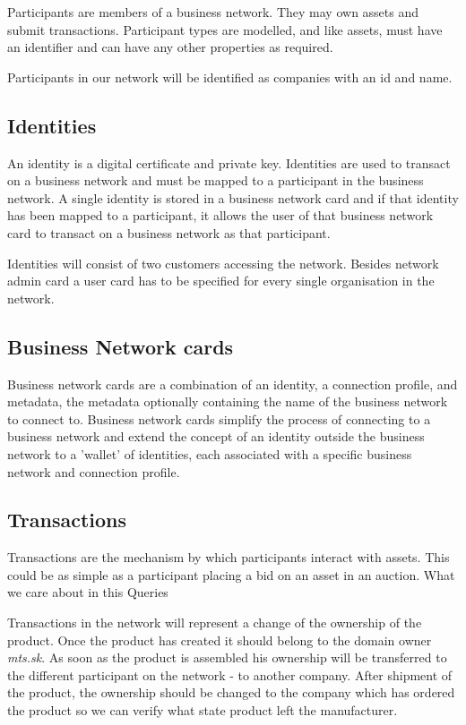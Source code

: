 Participants are members of a business network. They may own assets and submit transactions. Participant types are modelled, and like assets, must have an identifier and can have any other properties as required.

Participants in our network will be identified as companies with an id and name. 

\subsection{Identities}
An identity is a digital certificate and private key. Identities are used to transact on a business network and must be mapped to a participant in the business network. A single identity is stored in a business network card and if that identity has been mapped to a participant, it allows the user of that business network card to transact on a business network as that participant.

Identities will consist of two customers accessing the network. Besides network admin card a user card has to be specified for every single organisation in the network.

\subsection{Business Network cards}

Business network cards are a combination of an identity, a connection profile, and metadata, the metadata optionally containing the name of the business network to connect to. Business network cards simplify the process of connecting to a business network and extend the concept of an identity outside the business network to a 'wallet' of identities, each associated with a specific business network and connection profile.

\subsection{Transactions}

Transactions are the mechanism by which participants interact with assets. This could be as simple as a participant placing a bid on an asset in an auction. What we care about in this 
Queries

Transactions in the network will represent a change of the ownership of the product. Once the product has created it should belong to the domain owner \emph{mts.sk}. As soon as the product is assembled his ownership will be transferred to the different participant on the network - to another company. After shipment of the product, the ownership should be changed to the company which has ordered the product so we can verify what state product left the manufacturer.

